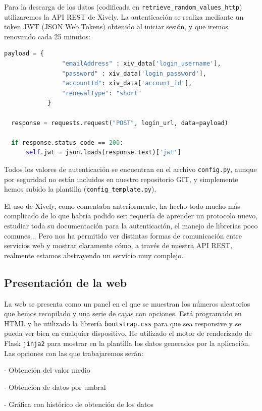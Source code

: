 \documentclass{article}
\begin{document}
Para la descarga de los datos (codificada en \texttt{retrieve\_random\_values\_http})  utilizaremos la API REST de Xively. La autenticación se realiza mediante un token JWT (JSON Web Tokens) obtenido al iniciar sesión, y que iremos renovando cada 25 minutos:

\begin{lstlisting}[language=python]
  payload = {
                "emailAddress" : xiv_data['login_username'],
                "password" : xiv_data['login_password'],
                "accountId": xiv_data['account_id'],
                "renewalType": "short"
            }

  response = requests.request("POST", login_url, data=payload)

  if response.status_code == 200:
      self.jwt = json.loads(response.text)['jwt']
\end{lstlisting}


Todos los valores de autenticación se encuentran en el archivo \texttt{config.py}, aunque por seguridad no están incluidos en nuestro repositorio GIT, y simplemente hemos subido la plantilla (\texttt{config\_template.py}).

El uso de Xively, como comentaba anteriormente, ha hecho todo mucho más complicado de lo que habría podido ser: requería de aprender un protocolo nuevo, estudiar toda su documentación para la autenticación, el manejo de librerías poco comunes... Pero nos ha permitido ver distintas formas de comunicación entre servicios web y mostrar claramente cómo, a través de nuestra API REST, realmente estamos abstrayendo un servicio muy complejo.

\subsection{Presentación de la web}

La web se presenta como un panel en el que se muestran los números aleatorios que hemos recopilado y una serie de cajas con opciones. Está programado en HTML y he utilizado la librería \texttt{bootstrap.css} para que sea responsive y se pueda ver bien en cualquier dispositivo. He utilizado el motor de renderizado de Flask \texttt{jinja2} para mostrar en la plantilla los datos generados por la aplicación. Las opciones con las que trabajaremos serán:

- Obtención del valor medio

- Obtención de datos por umbral

- Gráfica con histórico de obtención de los datos
\end{document}

